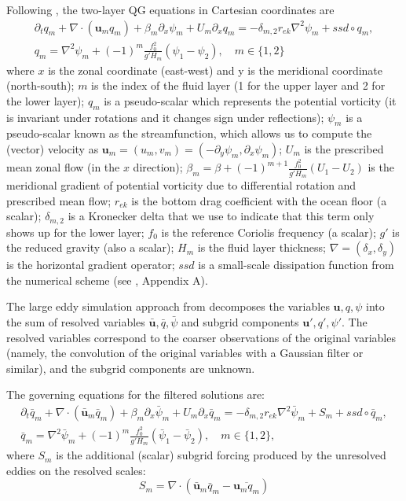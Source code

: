 \documentclass[11pt]{article}
\begin{document}
Following \cite{pyqg}, the two-layer QG equations in Cartesian coordinates are
\begin{align} \label{eq.QG1}
    \partial_t q_m + \nabla\cdot (\mathbf u_m q_m) + \beta_m \partial_x \psi_m + U_m\partial_x q_m = -\delta_{m,2}r_{ek}\nabla^2\psi_m +ssd\circ q_m, \\
    q_m = \nabla^2\psi_m+(-1)^m\frac{f_0^2}{g'H_m}(\psi_1-\psi_2), \quad m\in\{1,2\}
    \label{eq.QG2}
\end{align}
where $x$ is the zonal coordinate (east-west) and y is the meridional coordinate (north-south); $m$ is the index of the fluid layer (1 for the upper layer and 2 for the lower layer); $q_m$ is a pseudo-scalar which represents the potential vorticity (it is invariant under rotations and it changes sign under reflections); $\psi_m$ is a pseudo-scalar known as the streamfunction, which allows us to compute the (vector) velocity as 
$\mathbf u_m=(u_m, v_m) = (-\partial_y\psi_m, \partial_x \psi_m)$; $U_m$ is the prescribed mean zonal flow (in the $x$ direction); $\beta_m = \beta + (-1)^{m+1} \frac{f_0^2}{g'H_m}(U_1-U_2)$ is the meridional gradient of potential vorticity due to differential rotation and prescribed mean flow; $r_{ek}$ is the bottom drag coefficient with the ocean floor (a scalar); $\delta_{m,2}$ is a Kronecker delta that we use to indicate that this term only shows up for the lower layer; $f_0$ is the reference Coriolis frequency (a scalar); $g'$ is the reduced gravity (also a scalar); $H_m$ is the fluid layer thickness; $\nabla = (\delta_x, \delta_y)$ is the horizontal gradient operator; $ssd$ is a small-scale dissipation function from the numerical scheme (see \cite{perezhogin2023generative}, Appendix A). 



The large eddy simulation approach from \cite{sagaut2005large} decomposes the variables $\mathbf u, q, \psi$ into the sum of resolved variables $\bar{\mathbf u}, \bar q, \bar \psi$ and subgrid components  $\mathbf u', q', \psi'$. The resolved variables correspond to the coarser observations of the original variables (namely, the convolution of the original variables with a Gaussian filter or similar), and the subgrid components are unknown. 

The governing equations for the filtered solutions are:
\begin{align}
    \partial_t \bar q_m + \nabla\cdot (\bar{\mathbf u}_m \bar q_m) + \beta_m \partial_x \bar \psi_m + U_m\partial_x \bar q_m = -\delta_{m,2}r_{ek}\nabla^2\bar \psi_m + S_m +ssd\circ \bar q_m, \\
    \bar q_m = \nabla^2\bar\psi_m+(-1)^m\frac{f_0^2}{g'H_m}(\bar \psi_1-\bar \psi_2), \quad m\in\{1,2\},
\end{align}
where $S_m$ is the additional (scalar) subgrid forcing produced by the unresolved eddies on the resolved scales:
\begin{equation}
    S_m = \nabla \cdot (\bar{\mathbf u}_m \bar q_m - \overline{\mathbf u_m q_m})
\end{equation}
\end{document}
